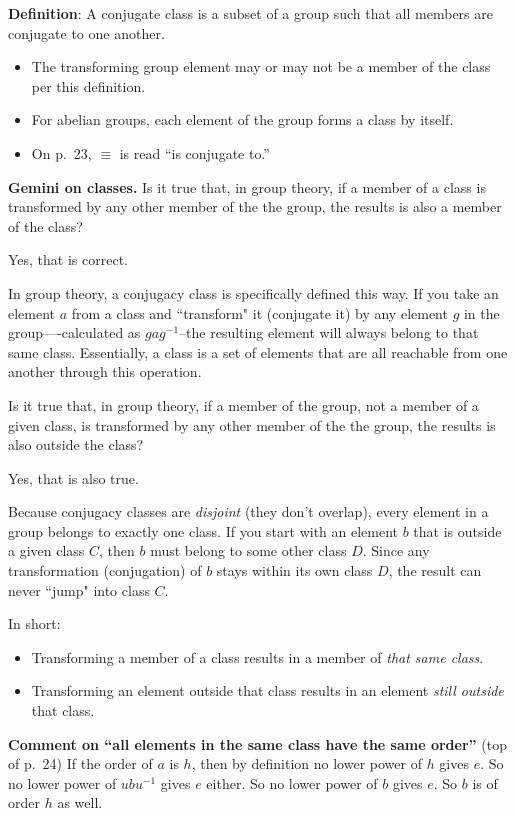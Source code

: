 {\bf Definition}: A conjugate class is a subset of a group such that
all members are conjugate to one another.
\begin{itemize}
  \item The transforming group element may or may not be a member of
    the class per this definition.
  \item For abelian groups, each element of the group forms a class by itself.
  \item On p.\ 23, $\equiv$ is read ``is conjugate to.''
\end{itemize}

{\bf Gemini on classes.} Is it true that, in group theory, if a member
of a class is transformed by any other member of the the group, the
results is also a member of the class?

Yes, that is correct.

In group theory, a conjugacy class is specifically defined this
way. If you take an element $a$ from a class and ``transform" it
(conjugate it) by any element $g$ in the group—-calculated as
$gag^{-1}$--the resulting element will always belong to that same
class.  Essentially, a class is a set of elements that are all
reachable from one another through this operation.

Is it true that, in group theory, if a member of the group, not a
member of a given class, is transformed by any other member of the the
group, the results is also outside the class?

Yes, that is also true.

Because conjugacy classes are {\it disjoint} (they don't overlap),
every element in a group belongs to exactly one class.  If you start
with an element $b$ that is outside a given class $C$, then $b$ must
belong to some other class $D$. Since any transformation (conjugation)
of $b$ stays within its own class $D$, the result can never ``jump"
into class $C$.

In short:

\begin{itemize}
\item Transforming a member of a class results in a member of {\it that
  same class}.
\item Transforming an element outside that class results in an element
  {\it still outside} that class.
\end{itemize}

{\bf Comment on ``all elements in the same class have the same
  order''} (top of p.\ 24) If the order of $a$ is $h$, then by definition
no lower power
of $h$ gives $e$. So no lower power of $ubu^{-1}$ gives $e$ either. So
no lower power of $b$ gives $e$. So $b$ is of order $h$ as well.

